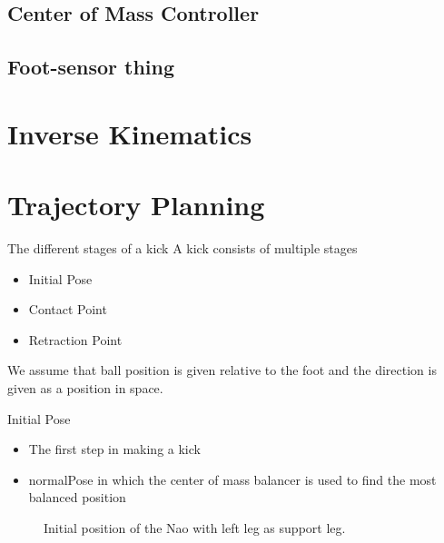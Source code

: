 \documentclass{beamer}
\begin{document}
\subsection{Center of Mass Controller}


\subsection{Foot-sensor thing}

\section{Inverse Kinematics}

\section{Trajectory Planning}
\begin{frame}{The different stages of a kick}
    A kick consists of multiple stages
    \begin{itemize}
        \item Initial Pose
        \item Contact Point
        \item Retraction Point
    \end{itemize}
    We assume that ball position is given relative to the foot and the direction
    is given as a position in space.
\end{frame}

\begin{frame}{Initial Pose}
    \begin{itemize}
        \item The first step in making a kick
        \item normalPose in which the center of mass balancer is used to find
            the most balanced position
    \end{itemize}

    \begin{figure}[htbp]
      \centering
      \caption{Initial position of the Nao with left leg as support leg.}
    \end{figure}
\end{frame}
\end{document}
